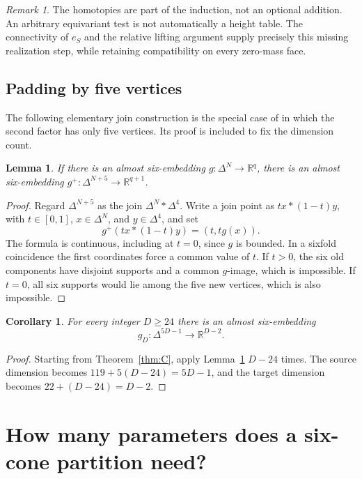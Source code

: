 \documentclass[a4paper,11pt,reqno]{amsart}
\newcommand{\R}{\mathbb R}
\newtheorem{lemma}[theorem]{Lemma}
\newtheorem{corollary}[theorem]{Corollary}
\theoremstyle{definition}
\theoremstyle{remark}
\newtheorem{remark}[theorem]{Remark}
\numberwithin{equation}{section}
\begin{document}
\begin{remark}
The homotopies are part of the induction, not an optional addition.
An arbitrary equivariant test is not automatically a height table.
The connectivity of $e_S$ and the relative lifting argument supply
precisely this missing realization step, while retaining compatibility
on every zero-mass face.
\end{remark}

\subsection{Padding by five vertices}
The following elementary join construction is the special case of
\cite[Remark 1.2(a)]{AKS} in which the second factor has only five
vertices. Its proof is included to fix the dimension count.
\begin{lemma}\label{lem:padding}
If there is an almost six-embedding $g:\Delta^N\to\R^q$, there is an
almost six-embedding $g^+:\Delta^{N+5}\to\R^{q+1}$.
\end{lemma}
\begin{proof}
Regard $\Delta^{N+5}$ as the join $\Delta^N*\Delta^4$. Write a join
point as $t x*(1-t)y$, with $t\in[0,1]$, $x\in\Delta^N$, and
$y\in\Delta^4$, and set
\[
                    g^+(t x*(1-t)y)=(t,tg(x)).
\]
The formula is continuous, including at $t=0$, since $g$ is bounded.
In a sixfold coincidence the first coordinates force a common value
of $t$. If $t>0$, the six old components have disjoint supports and
a common $g$-image, which is impossible. If $t=0$, all six supports
would lie among the five new vertices, which is also impossible.
\end{proof}

\begin{corollary}\label{cor:wideall}
For every integer $D\ge24$ there is an almost six-embedding
\[
                       g_D:\Delta^{5D-1}\longrightarrow\R^{D-2}.
\]
\end{corollary}
\begin{proof}
Starting from Theorem~\ref{thm:C}, apply Lemma~\ref{lem:padding}
$D-24$ times. The source dimension becomes
$119+5(D-24)=5D-1$, and the target dimension becomes
$22+(D-24)=D-2$.
\end{proof}

\section{How many parameters does a six-cone partition need?}\label{sec:cones}
\end{document}
